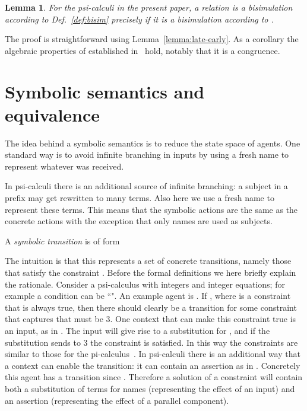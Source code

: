 \documentclass{eptcs}
\newtheorem{lemma}[definition]{Lemma}
\theoremstyle{definition}
\begin{document}
\begin{lemma}
For the psi-calculi in the present paper, a relation is a bisimulation according to Def.~\ref{def:bisim} precisely if it is a bisimulation according to \cite{bengtson.johansson.ea:psi-calculi}.
\end{lemma}
The proof is straightforward using Lemma~\ref{lemma:late-early}. As a corollary
the algebraic properties of  established
in~\cite{bengtson.johansson.ea:psi-calculi} hold, notably that it is a
congruence.

\section{Symbolic semantics and equivalence}
\label{sec:symbolic}
The idea behind a symbolic semantics is to reduce the state space of agents. One
standard way is to avoid infinite branching in inputs by 
using a fresh name to represent whatever was received.

In psi-calculi there is an additional source of infinite branching:  a subject  
in a prefix may get rewritten
to many terms. Also here we use a fresh name to represent these terms.
This means that the symbolic actions are the same as
the concrete actions with the exception that only names are used as subjects.

 
A {\em symbolic transition} is of form 

The intuition is that this represents a set of concrete transitions,
namely those that satisfy the constraint . Before the formal
definitions we here briefly explain the rationale. Consider a
psi-calculus with integers and integer equations; for example a
condition can be ``". An example agent is 
.
If , where  is a constraint that is
always true, then there should clearly be
a transition
 for some constraint  that captures
that
 must be 3. One
context that can make
this constraint true is an
input, as in . The input will give rise to a substitution for
, and if the substitution sends  to 3 the constraint is
satisfied. 
In this way the constraints are similar to those for the pi-calculus~\cite{boreale.de-nicola:symbolic-semantics,lin:symbolic-transition}.
In psi-calculi there is an additional way that a context
can enable the transition: it can contain an assertion as in
. Concretely this agent has a
transition
 since . 
Therefore a solution of a constraint will 
contain both a substitution of terms for names (representing the
effect of an input) and an assertion (representing the effect of a
parallel component).
\end{document}
